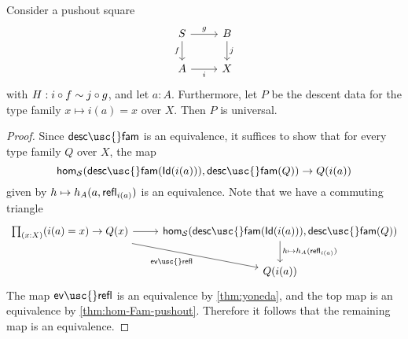 \begin{lem}
  Consider a pushout square
  \begin{equation*}
    \begin{tikzcd}
      S \arrow[r,"g"] \arrow[d,swap,"f"] & B \arrow[d,"j"] \\
      A \arrow[r,swap,"i"] & X
    \end{tikzcd}
  \end{equation*}
  with $H:i\circ f \sim j\circ g$, and let $a:A$. Furthermore, let $P$ be the descent data for the type family $x\mapsto i(a)=x$ over $X$. Then $P$ is universal.
\end{lem}

\begin{proof}
  Since $\mathsf{desc\usc{}fam}$ is an equivalence, it suffices to show that for every type family $Q$ over $X$, the map
  \begin{equation*}
    \mathsf{hom}_{\mathcal{S}}(\mathsf{desc\usc{}fam}(\mathsf{Id}(i(a))),\mathsf{desc\usc{}fam}(Q))\to Q(i(a))
  \end{equation*}
  given by $h\mapsto h_A(a,\mathsf{refl}_{i(a)})$ is an equivalence. 
  Note that we have a commuting triangle
  \begin{equation*}
    \begin{tikzcd}
      \prd{x:X}(i(a)=x)\to Q(x) \arrow[r] \arrow[dr,swap,"\mathsf{ev\usc{}refl}"] &
      \mathsf{hom}_{\mathcal{S}}(\mathsf{desc\usc{}fam}(\mathsf{Id}(i(a))),\mathsf{desc\usc{}fam}(Q)) \arrow[d,"{h\mapsto h_A(\refl{i(a)})}"] \\
      & Q(i(a))
    \end{tikzcd}
  \end{equation*}
  The map $\mathsf{ev\usc{}refl}$ is an equivalence by \cref{thm:yoneda}, and the top map is an equivalence by \cref{thm:hom-Fam-pushout}. Therefore it follows that the remaining map is an equivalence.
\end{proof}

